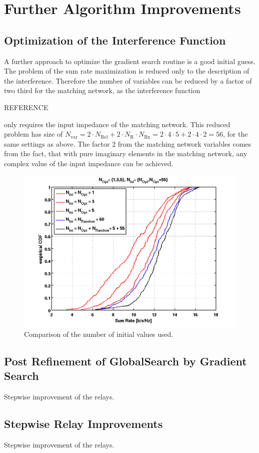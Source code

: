 \section{Further Algorithm Improvements}

\subsection{Optimization of the Interference Function}

A further approach to optimize the gradient search routine is a good initial guess.
The problem of the sum rate maximization is reduced only to the description of the interference.
Therefore the number of variables can be reduced by a factor of two third for the matching network, as the interference function

REFERENCE

only requires the input impedance of the matching network.
This reduced problem has size of $N_\text{var} =  2\cdot N_\text{Rel}+2\cdot N_\text{R}\cdot N_\text{Rx} = 2\cdot 4\cdot 5 + 2\cdot 4\cdot 2 = 56$, for the same settings as above.
The factor 2 from the matching network variables comes from the fact, that with pure imaginary elements in the matching network, any complex value of the input impedance can be achieved.

\begin{figure}[h]
\centering
  \includegraphics[width=0.8\linewidth]{images/Inioptcomparison_edited.png}
\caption{Comparison of the number of initial values used.}
\label{fig:ini_comp}
\end{figure}

\subsection{Post Refinement of GlobalSearch by Gradient Search}
Stepwise improvement of the relays.


\subsection{Stepwise Relay Improvements}
Stepwise improvement of the relays.







